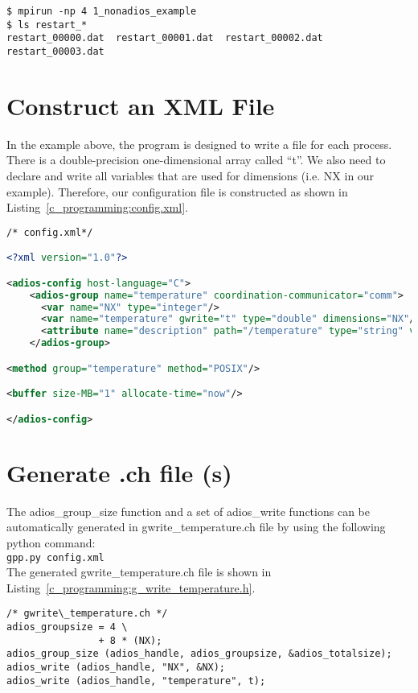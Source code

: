 \begin{lstlisting}[]
$ mpirun -np 4 1_nonadios_example
$ ls restart_*
restart_00000.dat  restart_00001.dat  restart_00002.dat  restart_00003.dat
\end{lstlisting}

\section{Construct an XML File}

In the example above, the program is designed to write a file for each process. 
There is a double-precision one-dimensional array called ``t''. We also need to 
declare and write all variables that are used for dimensions (i.e. NX in our example). 
Therefore, our configuration file is constructed as shown in Listing~\ref{c_programming:config.xml}.

\begin{lstlisting}[language=XML,caption=Example config.xml]
/* config.xml*/

<?xml version="1.0"?>

<adios-config host-language="C">
    <adios-group name="temperature" coordination-communicator="comm">
      <var name="NX" type="integer"/>
      <var name="temperature" gwrite="t" type="double" dimensions="NX"/>
      <attribute name="description" path="/temperature" type="string" value="Temperature array" />
    </adios-group>

<method group="temperature" method="POSIX"/>

<buffer size-MB="1" allocate-time="now"/>

</adios-config>
\end{lstlisting}\label{c_programming:config.xml}

\section{Generate .ch file (s)}

The adios\_group\_size function and a set of adios\_write functions can be automatically 
generated in gwrite\_temperature.ch file by using the following python command: 
\\
\texttt{gpp.py config.xml}
\\

The generated gwrite\_temperature.ch file is shown in Listing~\ref{c_programming:g_write_temperature.h}.

\begin{lstlisting}[alsolanguage=C,caption=Example gwrite\_temperature.ch]
/* gwrite\_temperature.ch */
adios_groupsize = 4 \
                + 8 * (NX);
adios_group_size (adios_handle, adios_groupsize, &adios_totalsize);
adios_write (adios_handle, "NX", &NX);
adios_write (adios_handle, "temperature", t);
\end{lstlisting}\label{c_programming:g_write_temperature.h}

